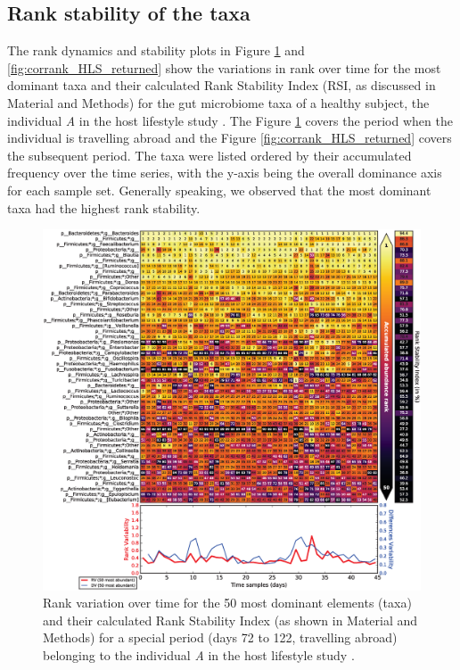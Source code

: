 \subsection*{Rank stability of the taxa} 

The rank dynamics and stability plots in Figure \ref{fig:corrank_HLS_abroad} and \ref{fig:corrank_HLS_returned} show the variations in rank over time for the most dominant taxa and their calculated Rank Stability Index (RSI, as discussed in Material and Methods) for the gut microbiome taxa of a healthy subject, the individual \emph{A} in the host lifestyle study \cite{hostlife}. The Figure \ref{fig:corrank_HLS_abroad} covers the period when the individual is travelling abroad and the Figure \ref{fig:corrank_HLS_returned} covers the subsequent period. The taxa were listed ordered by their accumulated frequency over the time series, with the y-axis being the overall dominance axis for each sample set. Generally speaking, we observed that the most dominant taxa had the highest rank stability. 

\begin{figure}
	\centering
	\includegraphics[width=1.0\textwidth]{figs/Fig4.eps}
	\caption{Rank variation over time for the 50 most dominant elements (taxa) and their calculated Rank Stability Index (as shown in Material and Methods) for a special period (days 72 to 122, travelling abroad) belonging to the individual \emph{A} in the host lifestyle study \cite{hostlife}.}
	\label{fig:corrank_HLS_abroad}
\end{figure}

